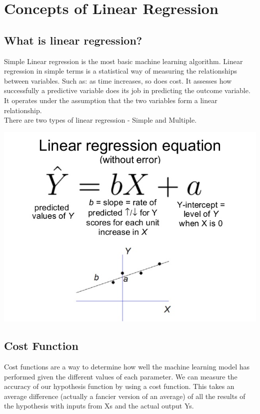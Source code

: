 \documentclass{42-en}
\begin{document}
\chapter{Concepts of Linear Regression}
\section*{What is linear regression?}

Simple Linear regression is the most basic machine learning algorithm. Linear regression in simple terms is a statistical way of measuring the relationships between variables. Such as: as time increases, so does cost. It assesses how successfully a predictive variable does its job in predicting the outcome variable. It operates under the assumption that the two variables form a linear relationship.\\

There are two types of linear regression - Simple and Multiple.\\

\centerline{\includegraphics[width=150mm]{images/multiple-linear-regression.jpg}}

\section*{Cost Function}

Cost functions are a way to determine how well the machine learning model has performed given the different values of each parameter. We can measure the accuracy of our hypothesis function by using a cost function. This takes an average difference (actually a fancier version of an average) of all the results of the hypothesis with inputs from Xs and the actual output Ys.\\
\end{document}
